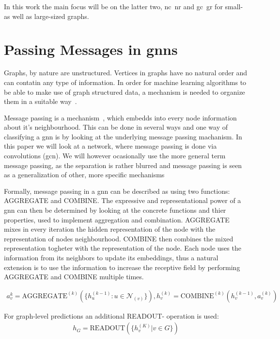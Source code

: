 In this work the main focus will be on the latter two, \ac{nc}\ \ac{nr} and \ac{gc}\
\ac{gr} for small- as well as large-sized graphs.

\section{Passing Messages in \Acsp*{gnn}}
\label{sec:related:message}

Graphs, by nature are unstructured. Vertices in graphs have no natural order and can
contatin any type of information. In order for machine learning algorithms to be able
to make use of graph structured data, a mechanism is needed to organize them in a
suitable way~\cite{Zhou2020a,Hamilton2017a,Zhang19}.


Message passing is a mechanism~\cite{Xu2019,Zhou2020a}, which embedds into every node information about it's neighbourhood.
This can be done in several ways and one way of classifying a \ac{gnn} is by looking at the
underlying message passing machanism. In this paper we will look at a network, where message passing is done
via convolutions (\acf{gcn}). We will however ocasionally use the more general term message passing, as
the separation is rather blurred and message passing is seen as a generalization of
other, more specific mechanisms

Formally, message passing in a \ac{gnn} can be described as using two functions:
AGGREGATE and COMBINE. The expressive and representational power of a \ac{gnn} can
then be determined by looking at the concrete functions and thier properties, used to implement
aggregation and combination. AGGREGATE mixes in every iteration the hidden representation of the node
with the representation of nodes neighbourhood. COMBINE then combines the mixed representation togheter with the
representation of the node. Each node uses the information from its neighbors to update its embeddings, thus a natural
extension is to use the information to increase the receptive field by performing AGGREGATE and COMBINE multiple
times.

\begin{align*}
    a_{v}^{k} = \mathrm{AGGREGATE}^{(k)}(\{h_{u}^{(k-1)}: u \in \mathcal{N}_{(v)}\}) , h_{v}^{(k)} = \mathrm{COMBINE}^{(k)}(h_{v}^{(k-1)}, a_{v}^{(k)})
\end{align*}

For graph-level predictions an additional READOUT- operation is used:
\begin{align*}
    h_{G} =\mathrm{READOUT}(\{h_{v}^{(K)}| v \in G\})
\end{align*}

